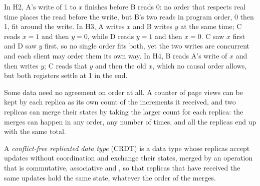 \label{out:b3:replication-and-consensus:consistency}

In H2, A's write of 1 to $x$ finishes before B reads 0: no order that respects real time places the read before the write, but B's two reads in program order, 0 then 1, fit around the write. In H3, A writes $x$ and B writes $y$ at the same time; C reads $x = 1$ and then $y = 0$, while D reads $y = 1$ and then $x = 0$. C saw $x$ first and D saw $y$ first, so no single order fits both, yet the two writes are concurrent and each client may order them its own way. In H4, B reads A's write of $x$ and then writes $y$; C reads that $y$ and then the old $x$, which no causal order allows, but both registers settle at 1 in the end.

\begin{omfigure}
\par{}
\end{omfigure}

Some data need no agreement on order at all. A counter of page views can be kept by each replica as its own count of the increments it received, and two replicas can merge their states by taking the larger count for each replica: the merges can happen in any order, any number of times, and all the replicas end up with the same total.

\begin{definition}\label{def:b3:replication-and-consensus:crdt}
A \emph{conflict-free replicated data type} (CRDT) is a data type whose replicas accept updates without coordination and exchange their states, merged by an operation that is commutative, associative and , so that replicas that have received the same updates hold the same state, whatever the order of the merges.
\end{definition}

